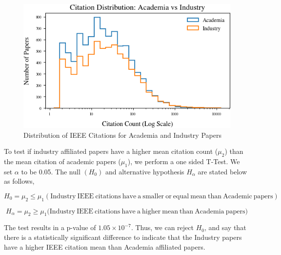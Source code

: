 \documentclass{article}
\begin{document}
\begin{figure}
    \centering
    \includegraphics[width=0.6\linewidth]{images/histogram_ieee_citations.png}
    \caption{Distribution of IEEE Citations for Academia and Industry Papers}
    \label{fig:ieee_citations}
\end{figure}

To test if industry affiliated papers have a higher mean citation count ($\mu_2$) than the mean citation of academic papers ($\mu_1$), we perform a one sided T-Test. We set $\alpha$ to be 0.05. The null $(H_0)$ and alternative hypothesis $H_\alpha$ are stated below as follows,

\[
H_0 = \mu_2 \leq \mu_1 (\mathrm{Industry \  IEEE \  citations \ have\  a \ smaller\  or\  equal\  mean \ than\  Academic\  papers})
\]

\[
H_\alpha = \mu_2 \geq \mu_1 (\mathrm{Industry \ IEEE\ citations \ have \ a \ higher\ mean \ than \ Academia \ papers)}
\]

The test results in a p-value of $1.05 \times 10^{-7}$. Thus, we can reject $H_0$, and say that there is a statistically significant difference to indicate that the Industry papers have a higher IEEE citation mean than Academia affiliated papers. 
\end{document}
